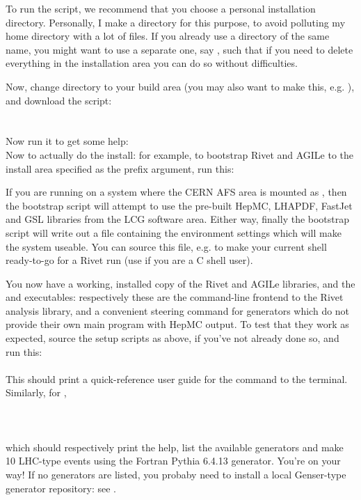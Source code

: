 \documentclass{JHEP3}
\begin{document}
To run the script, we recommend that you choose a personal installation
directory. Personally, I make a  directory for this purpose, to
avoid polluting my home directory with a lot of files. If you already use a
directory of the same name, you might want to use a separate one, say
, such that if you need to delete everything in the
installation area you can do so without difficulties.

Now, change directory to your build area (you may also want to make this,
e.g. ), and download the script:\\
\\
\\
Now run it to get some help:
\\
Now to actually do the install: for example, to bootstrap Rivet and AGILe 
to the install area specified as the prefix argument, run this:\\

If you are running on a system where the CERN AFS area is mounted as
, then the bootstrap script will attempt to use the pre-built
HepMC\cite{Dobbs:2001ck}, LHAPDF\cite{Whalley:2005nh},
FastJet\cite{Cacciari:2006sm} and GSL libraries from the LCG software area.
Either way, finally the bootstrap script will write out a file containing the
environment settings which will make the system useable. You can source this
file, e.g.  to make your current shell ready-to-go
for a Rivet run (use  if you are a C shell user).

You now have a working, installed copy of the Rivet and AGILe libraries, and the
 and  executables: respectively these are the
command-line frontend to the Rivet analysis library, and a convenient steering
command for generators which do not provide their own main program with HepMC
output. To test that they work as expected, source the setup scripts as above,
if you've not already done so, and run this:\\
\\
%
This should print a quick-reference user guide for the  command to
the terminal. Similarly, for ,\\
\\
\\
\\
which should respectively print the help, list the available generators and make
10 LHC-type events using the Fortran Pythia\cite{Sjostrand:2006za} 6.4.13 generator. You're on your
way! If no generators are listed, you probaby need to install a local
Genser-type generator repository: see .
\end{document}
